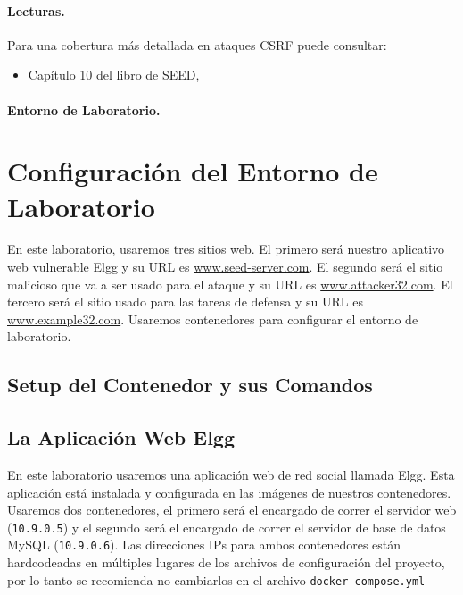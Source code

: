 \paragraph{Lecturas.}
Para una cobertura más detallada en ataques CSRF puede consultar:

\begin{itemize}
\item Capítulo 10 del libro de SEED, \seedbook
\end{itemize}


\paragraph{Entorno de Laboratorio.} 
\seedenvironmentB 
\nodependency



\section{Configuración del Entorno de Laboratorio}

En este laboratorio, usaremos tres sitios web.
El primero será nuestro aplicativo web vulnerable Elgg y su URL es \url{www.seed-server.com}. El segundo será el sitio malicioso que va a ser usado para el ataque y su URL es \url{www.attacker32.com}. El tercero será el sitio usado para las tareas de defensa y su URL es \url{www.example32.com}.
Usaremos contenedores para configurar el entorno de laboratorio.

\subsection{Setup del Contenedor y sus Comandos}





\subsection{La Aplicación Web Elgg}

En este laboratorio usaremos una aplicación web de red social llamada Elgg.
Esta aplicación está instalada y configurada en las imágenes de nuestros contenedores. 
Usaremos dos contenedores, el primero será el encargado de correr el servidor web  (\texttt{10.9.0.5}) y el segundo será el encargado de correr el servidor de base de datos MySQL (\texttt{10.9.0.6}). 
Las direcciones IPs para ambos contenedores están hardcodeadas en múltiples lugares de los archivos de configuración del proyecto, por lo tanto se recomienda no cambiarlos en el archivo \texttt{docker-compose.yml}

